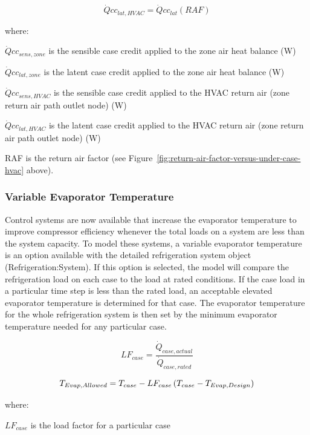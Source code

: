 \begin{equation}
\dot Qc{c_{lat,HVAC}} = \dot Qc{c_{lat}}\left( {RAF} \right)
\end{equation}

where:

\(\dot Qc{c_{sens,zone}}\) is the sensible case credit applied to the zone air heat balance (W)

\(\dot Qc{c_{lat,zone}}\) is the latent case credit applied to the zone air heat balance (W)

\(\dot Qc{c_{sens,HVAC}}\) is the sensible case credit applied to the HVAC return air (zone return air path outlet node) (W)

\(\dot Qc{c_{lat,HVAC}}\) is the latent case credit applied to the HVAC return air (zone return air path outlet node) (W)

RAF is the return air factor (see Figure~\ref{fig:return-air-factor-versus-under-case-hvac} above).

\subsubsection{Variable Evaporator Temperature}\label{variable-evaporator-temperature}

Control systems are now available that increase the evaporator temperature to improve compressor efficiency whenever the total loads on a system are less than the system capacity. To model these systems, a variable evaporator temperature is an option available with the detailed refrigeration system object (Refrigeration:System). If this option is selected, the model will compare the refrigeration load on each case to the load at rated conditions. If the case load in a particular time step is less than the rated load, an acceptable elevated evaporator temperature is determined for that case. The evaporator temperature for the whole refrigeration system is then set by the minimum evaporator temperature needed for any particular case.

\begin{equation}
  LF_{case} = \frac{\dot{Q}_{case,actual}}{\dot{Q}_{case,rated}}
\end{equation}

\begin{equation} 
  T_{Evap,Allowed} = T_{case} - LF_{case}\left(T_{case} - T_{Evap,Design}\right)
\end{equation}

where:

\(LF_{case}\) is the load factor for a particular case

